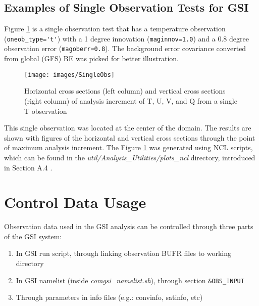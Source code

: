 \subsection{Examples of Single Observation Tests for GSI}

Figure \ref{fig:singleobs} is a single observation test that has a temperature observation (\verb|oneob_type='t'|) with a 1 degree innovation (\verb|maginnov=1.0|) and a 0.8 degree observation error (\verb|magoberr=0.8|). The background error covariance converted from global (GFS) BE was picked for better illustration.

\begin{figure}[h!]
  \centering
  \texttt{[image: images/SingleObs]}
  \caption{Horizontal cross sections (left column) and vertical cross sections (right column) of analysis increment of T, U, V, and Q from a single T observation}
  \label{fig:singleobs}
\end{figure}

This single observation was located at the center of the domain. The results are shown with figures of the horizontal and vertical cross sections through the point of maximum analysis increment. The Figure \ref{fig:singleobs} was generated using NCL scripts, which can be found in the \textit{util/Analysis\_Utilities/plots\_ncl} directory, introduced in Section A.4 .

\section{Control Data Usage}
\label{sec4.3}

Observation data used in the GSI analysis can be controlled through three parts of the GSI system:

\begin{enumerate}
\item In GSI run script, through linking observation BUFR files to working directory 
\item In GSI namelist (inside \textit{comgsi\_namelist.sh}), through section \verb|&OBS_INPUT|
\item Through parameters in info files (e.g.: convinfo, satinfo, etc)
\end{enumerate}

